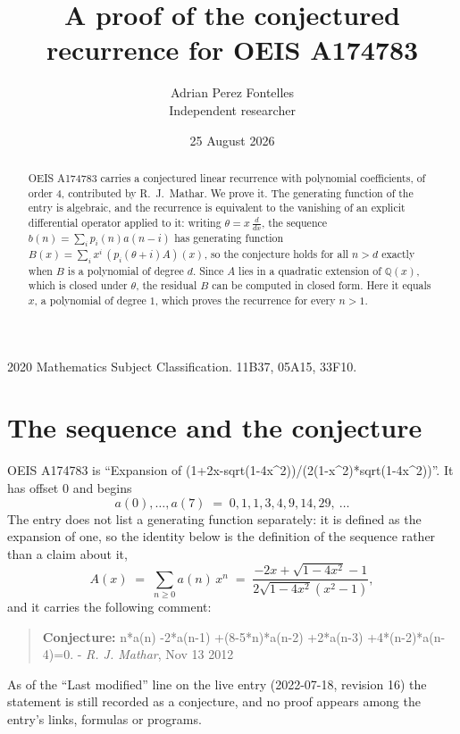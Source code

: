 \documentclass[11pt,a4paper]{article}
\title{A proof of the conjectured recurrence for OEIS A174783}
\author{Adrian Perez Fontelles\\ \small Independent researcher}
\date{25 August 2026}
\theoremstyle{plain}
\theoremstyle{definition}
\begin{document}
\maketitle

\begin{abstract}
OEIS A174783 carries a conjectured linear recurrence with polynomial coefficients, of
order 4, contributed by R.~J.~Mathar. We prove it. The generating function of the
entry is algebraic, and the recurrence is equivalent to the vanishing of an explicit
differential operator applied to it: writing $\theta=x\,\frac{d}{dx}$, the sequence
$b(n)=\sum_{i}p_{i}(n)a(n-i)$ has generating function
$B(x)=\sum_{i}x^{i}\,(p_{i}(\theta+i)A)(x)$, so the conjecture holds for all $n>d$ exactly
when $B$ is a polynomial of degree $d$. Since $A$ lies in a quadratic extension of
$\mathbb{Q}(x)$, which is closed under $\theta$, the residual $B$ can be computed in
closed form. Here it equals $x$, a polynomial of degree $1$, which proves
the recurrence for every $n>1$.
\end{abstract}

\noindent\small 2020 Mathematics Subject Classification. 11B37, 05A15, 33F10.\normalsize

\section{The sequence and the conjecture}

OEIS A174783 is ``Expansion of (1+2x-sqrt(1-4x\textasciicircum{}2))/(2(1-x\textasciicircum{}2)*sqrt(1-4x\textasciicircum{}2))''. It has offset $0$ and begins
\[
a(0),\dots,a(7)\;=\;0, 1, 1, 3, 4, 9, 14, 29,\ \dots
\]
The entry does not list a generating function separately: it is defined as the
expansion of one, so the identity below is the definition of the sequence rather than a
claim about it,
\begin{equation}\label{eq:gf}
A(x)\;=\;\sum_{n\ge 0} a(n)\,x^{n}\;=\;\frac{- 2 x + \sqrt{1 - 4 x^{2}} - 1}{2 \sqrt{1 - 4 x^{2}} \left(x^{2} - 1\right)} ,
\end{equation}
and it carries the following comment:
\begin{quote}\small
\textbf{Conjecture:} n*a(n) -2*a(n-1) +(8-5*n)*a(n-2) +2*a(n-3) +4*(n-2)*a(n-4)=0. - \emph{R. J. Mathar}, Nov 13 2012
\end{quote}
As of the ``Last modified'' line on the live entry (2022-07-18, revision 16) the
statement is still recorded as a conjecture, and no proof appears among the entry's links,
formulas or programs.
\end{document}
